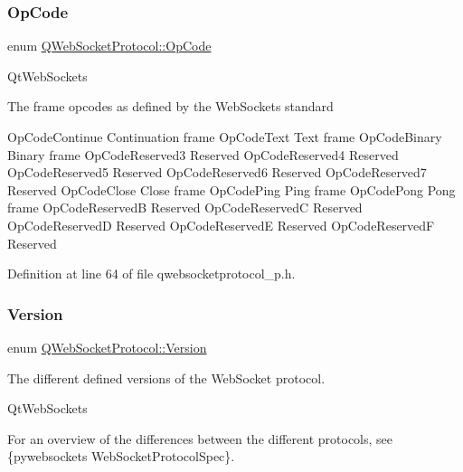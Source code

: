 \mbox{\label{namespace_q_web_socket_protocol_a93d3033ae9be614a2bc8f76c792e2e14}} 
\subsubsection{\texorpdfstring{Op\+Code}{OpCode}}
{\footnotesize\ttfamily enum \mbox{\hyperlink{namespace_q_web_socket_protocol_a93d3033ae9be614a2bc8f76c792e2e14}{Q\+Web\+Socket\+Protocol\+::\+Op\+Code}}}

Qt\+Web\+Sockets

The frame opcodes as defined by the Web\+Sockets standard

Op\+Code\+Continue Continuation frame  Op\+Code\+Text Text frame  Op\+Code\+Binary Binary frame  Op\+Code\+Reserved3 Reserved  Op\+Code\+Reserved4 Reserved  Op\+Code\+Reserved5 Reserved  Op\+Code\+Reserved6 Reserved  Op\+Code\+Reserved7 Reserved  Op\+Code\+Close Close frame  Op\+Code\+Ping Ping frame  Op\+Code\+Pong Pong frame  Op\+Code\+ReservedB Reserved  Op\+Code\+ReservedC Reserved  Op\+Code\+ReservedD Reserved  Op\+Code\+ReservedE Reserved  Op\+Code\+ReservedF Reserved 

Definition at line 64 of file qwebsocketprotocol\+\_\+p.\+h.

\mbox{\label{namespace_q_web_socket_protocol_ad53f2684577effe0a517eadb48714df3}} 
\subsubsection{\texorpdfstring{Version}{Version}}
{\footnotesize\ttfamily enum \mbox{\hyperlink{namespace_q_web_socket_protocol_ad53f2684577effe0a517eadb48714df3}{Q\+Web\+Socket\+Protocol\+::\+Version}}}



The different defined versions of the Web\+Socket protocol. 

Qt\+Web\+Sockets

For an overview of the differences between the different protocols, see  \{pywebsocket\textquotesingle{}s Web\+Socket\+Protocol\+Spec\}.

